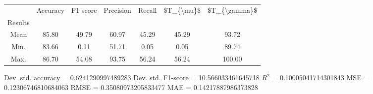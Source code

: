 \begin{tabular}{|c|c|c|c|c|c|c|}
\toprule
{} &  Accuracy &  F1 score &  Precision &  Recall &  \$T\_\{\textbackslash mu\}\$ &  \$T\_\{\textbackslash gamma\}\$ \\
Results &           &           &            &         &            &               \\
\hline
Mean    &     85.80 &     49.79 &      60.97 &   45.29 &      45.29 &         93.72 \\
Min.    &     83.66 &      0.11 &      51.71 &    0.05 &       0.05 &         89.74 \\
Max.    &     86.70 &     54.08 &      93.75 &   56.24 &      56.24 &        100.00 \\
\bottomrule
\end{tabular}

 Dev. std. accuracy = 0.6241290997489283
 Dev. std. F1-score = 10.566033461645718
 $R^2$ = 0.10005041714301843
 MSE = 0.12306746810684063
 RMSE = 0.35080973205833477
 MAE = 0.14217887986373828